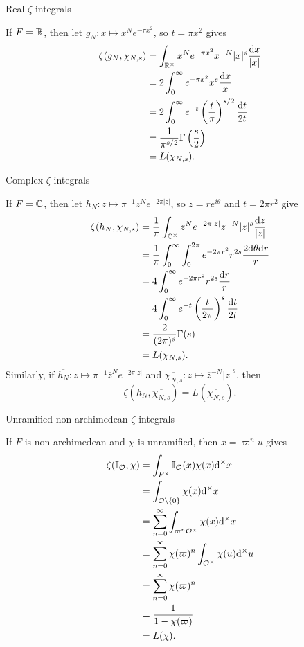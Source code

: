 \begin{frame}{Real $ \zeta $-integrals}

If $ F = \mathbb{R} $, then let $ g_N : x \mapsto x^Ne^{-\pi x^2} $, so $ t = \pi x^2 $ gives
\begin{align*}
\zeta(g_N, \chi_{N, s})
& = \int_{\mathbb{R}^\times} x^Ne^{-\pi x^2}x^{-N}|x|^s\dfrac{\mathrm{d} x}{|x|} \\
& = 2\int_0^\infty e^{-\pi x^2}x^s\dfrac{\mathrm{d} x}{x} \\
& = 2\int_0^\infty e^{-t}\left(\dfrac{t}{\pi}\right)^{s / 2}\dfrac{\mathrm{d} t}{2t} \\
& = \dfrac{1}{\pi^{s / 2}}\Gamma\left(\dfrac{s}{2}\right) \\
& = L(\chi_{N, s}).
\end{align*}

\end{frame}

\begin{frame}{Complex $ \zeta $-integrals}

If $ F = \mathbb{C} $, then let $ h_N : z \mapsto \pi^{-1}z^Ne^{-2\pi|z|} $, so $ z = re^{i\theta} $ and $ t = 2\pi r^2 $ give
\begin{align*}
\zeta(h_N, \chi_{N, s})
& = \dfrac{1}{\pi}\int_{\mathbb{C}^\times} z^Ne^{-2\pi|z|}z^{-N}|z|^s\dfrac{\mathrm{d} z}{|z|} \\
& = \dfrac{1}{\pi}\int_0^\infty \int_0^{2\pi} e^{-2\pi r^2}r^{2s}\dfrac{2\mathrm{d}\theta\mathrm{d} r}{r} \\
& = 4\int_0^\infty e^{-2\pi r^2}r^{2s}\dfrac{\mathrm{d} r}{r} \\
& = 4\int_0^\infty e^{-t}\left(\dfrac{t}{2\pi}\right)^s\dfrac{\mathrm{d} t}{2t} \\
& = \dfrac{2}{(2\pi)^s}\Gamma(s) \\
& = L(\chi_{N, s}).
\end{align*}
Similarly, if $ \overline{h_N} : z \mapsto \pi^{-1}\overline{z}^Ne^{-2\pi|z|} $ and $ \overline{\chi_{N, s}} : z \mapsto \overline{z}^{-N}|z|^s $, then
$$ \zeta(\overline{h_N}, \overline{\chi_{N, s}}) = L(\overline{\chi_{N, s}}). $$

\end{frame}

\begin{frame}{Unramified non-archimedean $ \zeta $-integrals}

If $ F $ is non-archimedean and $ \chi $ is unramified, then $ x = \varpi^nu $ gives
\begin{align*}
\zeta(\mathbb{I}_{\mathcal{O}}, \chi)
& = \int_{F^\times} \mathbb{I}_{\mathcal{O}}(x)\chi(x)\mathrm{d}^\times x \\
& = \int_{\mathcal{O} \setminus \{0\}} \chi(x)\mathrm{d}^\times x \\
& = \sum_{n = 0}^\infty \int_{\varpi^n\mathcal{O}^\times} \chi(x)\mathrm{d}^\times x \\
& = \sum_{n = 0}^\infty \chi(\varpi)^n\int_{\mathcal{O}^\times} \chi(u)\mathrm{d}^\times u \\
& = \sum_{n = 0}^\infty \chi(\varpi)^n \\
& = \dfrac{1}{1 - \chi(\varpi)} \\
& = L(\chi).
\end{align*}

\end{frame}

